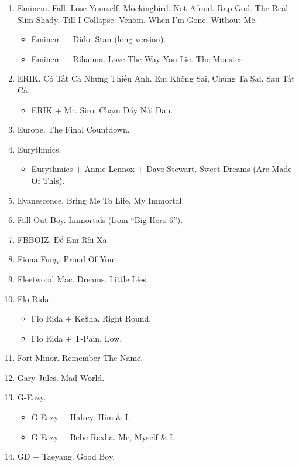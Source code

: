 \documentclass{article}
\begin{document}
\begin{enumerate}
\begin{itemize}
	\end{itemize}
	\item {\sc Eminem.} Fall. Lose Yourself. Mockingbird. Not Afraid. Rap God. The Real Slim Shady. Till I Collapse. Venom. When I'm Gone. Without Me.
	\begin{itemize}
		\item {\sc Eminem $+$ Dido.} Stan (long version).
		\item {\sc Eminem $+$ Rihanna.} Love The Way You Lie. The Monster.
	\end{itemize}
	\item {\sc ERIK.} Có Tất Cả Nhưng Thiếu Anh. Em Không Sai, Chúng Ta Sai. Sau Tất Cả.
	\begin{itemize}
		\item {\sc ERIK $+$ Mr. Siro.} Chạm Đáy Nỗi Đau.
	\end{itemize}
	\item {\sc Europe.} The Final Countdown.
	\item {\sc Eurythmics.}
	\begin{itemize}
		\item {\sc Eurythmics $+$ Annie Lennox $+$ Dave Stewart.} Sweet Dreams (Are Made Of This).
	\end{itemize}
	\item {\sc Evanescence.} Bring Me To Life. My Immortal.
	\item {\sc Fall Out Boy.} Immortals (from ``Big Hero 6'').
	\item {\sc FBBOIZ.} Để Em Rời Xa.
	\item {\sc Fiona Fung.} Proud Of You.
	\item {\sc Fleetwood Mac.} Dreams. Little Lies.
	\item {\sc Flo Rida.}
	\begin{itemize}
		\item {\sc Flo Rida $+$ Ke\$ha.} Right Round.
		\item {\sc Flo Rida $+$ T-Pain.} Low.
	\end{itemize}
	\item {\sc Fort Minor.} Remember The Name.
	\item {\sc Gary Jules.} Mad World.
	\item {\sc G-Eazy.}
	\begin{itemize}
		\item {\sc G-Eazy $+$ Halsey.} Him \& I.
		\item {\sc G-Eazy $+$ Bebe Rexha.} Me, Myself \& I.
	\end{itemize}	
	\item {\sc GD $+$ Taeyang.} Good Boy.

\end{enumerate}
\end{document}
